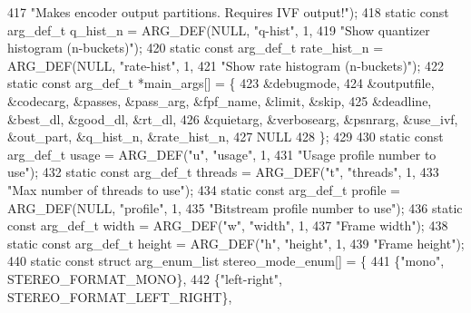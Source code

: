 \begin{DoxyCodeInclude}
{{417                                           \textcolor{stringliteral}{"Makes encoder output partitions. Requires IVF output!"});
418 \textcolor{keyword}{static} \textcolor{keyword}{const} arg\_def\_t q\_hist\_n         = ARG\_DEF(NULL, \textcolor{stringliteral}{"q-hist"}, 1,
419                                                   \textcolor{stringliteral}{"Show quantizer histogram (n-buckets)"});
420 \textcolor{keyword}{static} \textcolor{keyword}{const} arg\_def\_t rate\_hist\_n         = ARG\_DEF(NULL, \textcolor{stringliteral}{"rate-hist"}, 1,
421                                                      \textcolor{stringliteral}{"Show rate histogram (n-buckets)"});
422 \textcolor{keyword}{static} \textcolor{keyword}{const} arg\_def\_t *main\_args[] = \{
423   &debugmode,
424   &outputfile, &codecarg, &passes, &pass\_arg, &fpf\_name, &limit, &skip,
425   &deadline, &best\_dl, &good\_dl, &rt\_dl,
426   &quietarg, &verbosearg, &psnrarg, &use\_ivf, &out\_part, &q\_hist\_n, &rate\_hist\_n,
427   NULL
428 \};
429 
430 \textcolor{keyword}{static} \textcolor{keyword}{const} arg\_def\_t usage            = ARG\_DEF(\textcolor{stringliteral}{"u"}, \textcolor{stringliteral}{"usage"}, 1,
431                                                   \textcolor{stringliteral}{"Usage profile number to use"});
432 \textcolor{keyword}{static} \textcolor{keyword}{const} arg\_def\_t threads          = ARG\_DEF(\textcolor{stringliteral}{"t"}, \textcolor{stringliteral}{"threads"}, 1,
433                                                   \textcolor{stringliteral}{"Max number of threads to use"});
434 \textcolor{keyword}{static} \textcolor{keyword}{const} arg\_def\_t profile          = ARG\_DEF(NULL, \textcolor{stringliteral}{"profile"}, 1,
435                                                   \textcolor{stringliteral}{"Bitstream profile number to use"});
436 \textcolor{keyword}{static} \textcolor{keyword}{const} arg\_def\_t width            = ARG\_DEF(\textcolor{stringliteral}{"w"}, \textcolor{stringliteral}{"width"}, 1,
437                                                   \textcolor{stringliteral}{"Frame width"});
438 \textcolor{keyword}{static} \textcolor{keyword}{const} arg\_def\_t height           = ARG\_DEF(\textcolor{stringliteral}{"h"}, \textcolor{stringliteral}{"height"}, 1,
439                                                   \textcolor{stringliteral}{"Frame height"});
440 \textcolor{keyword}{static} \textcolor{keyword}{const} \textcolor{keyword}{struct }arg\_enum\_list stereo\_mode\_enum[] = \{
441   \{\textcolor{stringliteral}{"mono"}, STEREO\_FORMAT\_MONO\},
442   \{\textcolor{stringliteral}{"left-right"}, STEREO\_FORMAT\_LEFT\_RIGHT\},
}}
\end{DoxyCodeInclude}

